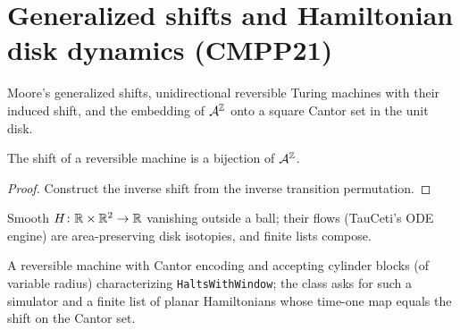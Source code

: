 \chapter{Generalized shifts and Hamiltonian disk dynamics (CMPP21)}
\label{chap_cmpp}

\begin{definition}
\label{def_shift}
\leanok
Moore's generalized shifts, unidirectional reversible Turing machines with their induced shift,
and the embedding of $\mathcal A^{\mathbb{Z}}$ onto a square Cantor set in the unit disk.
\end{definition}

\begin{lemma}
\label{lem_bijective}
\leanok
{}
The shift of a reversible machine is a bijection of $\mathcal A^{\mathbb{Z}}$.
\end{lemma}
\begin{proof}\leanok
Construct the inverse shift from the inverse transition permutation.
\end{proof}

\begin{definition}
\label{def_planar_ham}
\leanok
{}
Smooth $H\colon\mathbb{R}\times\mathbb{R}^2\to\mathbb{R}$ vanishing outside a ball; their flows (TauCeti's ODE engine)
are area-preserving disk isotopies, and finite lists compose.
\end{definition}

\begin{definition}
\label{def_simulator}
\leanok
{}
A reversible machine with Cantor encoding and accepting cylinder blocks (of variable radius)
characterizing \texttt{HaltsWithWindow}; the class asks for such a simulator and a finite list of
planar Hamiltonians whose time-one map equals the shift on the Cantor set.
\end{definition}

